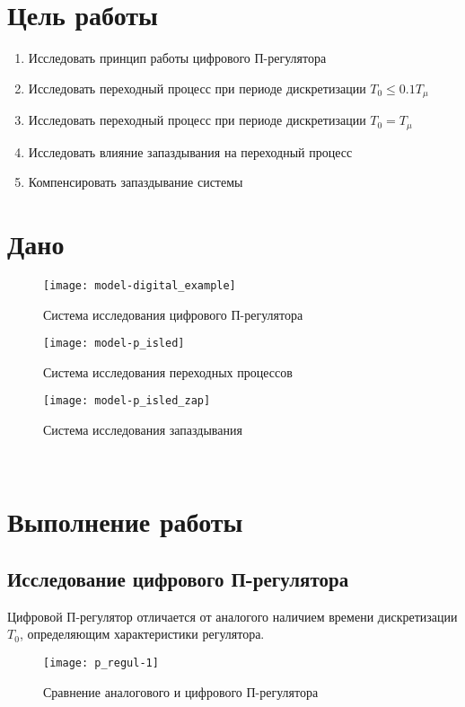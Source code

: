 


    


    \section{Цель работы}
    \begin{enumerate}
        \item Исследовать принцип работы цифрового П-регулятора
        \item Исследовать переходный процесс при периоде дискретизации $T_0\leq0.1T_\mu$
        \item Исследовать переходный процесс при периоде дискретизации $T_0=T_\mu$
        \item Исследовать влияние запаздывания на переходный процесс
        \item Компенсировать запаздывание системы
    \end{enumerate}


    \section{Дано}
    \begin{figure}[H]
        \centering\texttt{[image: model-digital\_example]}
        \caption{Система исследования цифрового П-регулятора}
    \end{figure}
    \begin{figure}[H]
        \centering\texttt{[image: model-p\_isled]}
        \caption{Система исследования переходных процессов}
    \end{figure}
    \begin{figure}[H]
        \centering\texttt{[image: model-p\_isled\_zap]}
        \caption{Система исследования запаздывания}
    \end{figure}

    \begin{center}
        \noindent{}\\
    \end{center}


    \section{Выполнение работы}

    \subsection{Исследование цифрового П-регулятора}
    Цифровой П-регулятор отличается от аналогого наличием времени дискретизации $T_0$,
    определяющим характеристики регулятора.
    \begin{figure}[H]
        \centering\texttt{[image: p\_regul-1]}
        \caption{Сравнение аналогового и цифрового П-регулятора}
    \end{figure}

